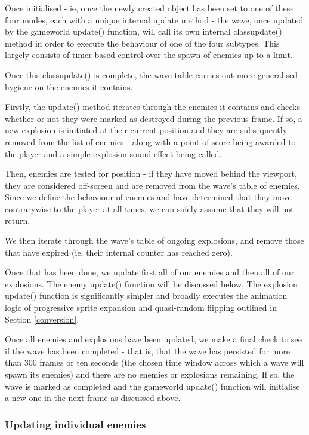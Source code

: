 \documentclass[11pt]{article}
\begin{document}
Once initialised - ie, once the newly created object has been set to one of these
four modes, each with a unique internal update method - the wave, once updated by the
game\textunderscore world update() function, will call its own internal
class\textunderscore update() method in order to execute the behaviour of one of
the four subtypes. This largely consists of timer-based control over the spawn of
enemies up to a limit.

Once this class\textunderscore update() is complete, the wave table carries out
more generalised hygiene on the enemies it contains.

Firstly, the update() method iterates through the enemies it contains and
checks whether or not they were marked as destroyed during the previous frame.
If so, a new explosion is initiated at their current position and they are
subsequently removed from the list of enemies - along with a point of score being
awarded to the player and a simple explosion sound effect being called.

Then, enemies are tested for position - if they have moved behind the viewport,
they are considered off-screen and are removed from the wave's table of enemies.
Since we define the behaviour of enemies and have determined that they move
contrarywise to the player at all times, we can safely assume that they will
not return.

We then iterate through the wave's table of ongoing explosions, and remove those
that have expired (ie, their internal counter has reached zero).

Once that has been done, we update first all of our enemies and then all of
our explosions. The enemy update() function will be discussed below. The
explosion update() function is significantly simpler and broadly executes
the animation logic of progressive sprite expansion and quasi-random flipping
outlined in Section \ref{conversion}.

Once all enemies and explosions have been updated, we make a final check to
see if the wave has been completed - that is, that the wave has persisted for
more than 300 frames or ten seconds (the chosen time window across which a
wave will spawn its enemies) and there are no enemies or explosions remaining.
If so, the wave is marked as completed and the game\textunderscore world update()
function will initialise a new one in the next frame as discussed above.

\subsubsection*{Updating individual enemies}
\end{document}
